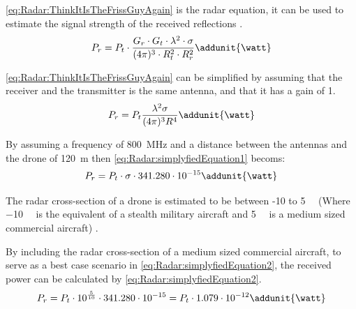 \autoref{eq:Radar:ThinkItIsTheFrissGuyAgain} is the radar equation, it can be used to estimate the signal strength of the received reflections \citep{web:ThroughTheEyesOfARadar}. 
\begin{equation} \label{eq:Radar:ThinkItIsTheFrissGuyAgain} 
P_{r} = P_{t} \cdot  \frac{G_{r} \cdot G_{t} \cdot  \lambda^{2} \cdot \sigma}{(4\pi)^{3} \cdot R_{t}^{2} \cdot R_{r}^{2}} \addunit{\watt}
\end{equation}
\startexplain
{}
\stopexplain

\autoref{eq:Radar:ThinkItIsTheFrissGuyAgain} can be simplified by assuming that the receiver and the transmitter is the same antenna, and that it has a gain of 1.
\begin{equation} \label{eq:Radar:simplyfiedEquation1} 
P_{r} = P_{t} \frac{\lambda^{2} \sigma}{(4\pi)^{3} R^{4}} \addunit{\watt}
\end{equation}

By assuming a frequency of \SI{800}{\mega\hertz} and a distance between the antennas and the drone of \SI{120}{\meter} then \autoref{eq:Radar:simplyfiedEquation1} becoms: 
\begin{equation} \label{eq:Radar:simplyfiedEquation3} 
P_{r} = P_{t} \cdot \sigma \cdot 341.280 \cdot 10^{-15} \addunit{\watt}
\end{equation}

The radar cross-section of a drone is estimated to be between -10 to \SI{5}{\deci\belsm} (Where \SI{-10}{\deci\belsm} is the equivalent of a stealth military aircraft and \SI{5}{\deci\belsm} is a medium sized commercial aircraft) \citep{web:ThroughTheEyesOfARadar}. 


By including the radar cross-section of a medium sized commercial aircraft, to serve as a best case scenario in \autoref{eq:Radar:simplyfiedEquation2}, the received power can be calculated by \autoref{eq:Radar:simplyfiedEquation2}.
\begin{equation} \label{eq:Radar:simplyfiedEquation2} 
P_{r} = P_{t} \cdot 10^{\frac{5}{10}} \cdot 341.280 \cdot 10^{-15} = P_{t} \cdot 1.079 \cdot 10^{-12} \addunit{\watt}
\end{equation}

